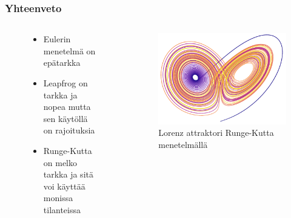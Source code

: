\documentclass[finnish, 11pt, fleqn]{beamer}
\begin{document}
\begin{frame}
	\frametitle{Yhteenveto}
    \begin{columns}[onlytextwidth]
		\begin{column}{.42\textwidth}
			\begin{figure}
				\vspace{-3em}
    			\begin{itemize}
    				\item{Eulerin menetelmä on epätarkka}
    				\vspace{0.5em}
    				\item{Leapfrog on tarkka ja nopea mutta sen käytöllä on rajoituksia}
					\vspace{0.5em}    				
    				\item{Runge-Kutta on melko tarkka ja sitä voi käyttää monissa tilanteissa}
    			\end{itemize}
			\end{figure}
		\end{column}
		\hfill
		\begin{column}{.55\textwidth}
			\vspace{-1em}
			\begin{figure}
				\includegraphics[scale=0.35]{graphics/attractor3.png}
				{\small \caption{Lorenz attraktori Runge-Kutta menetelmällä}}
			\end{figure}
		\end{column}
	\end{columns}
\end{frame}
\end{document}
